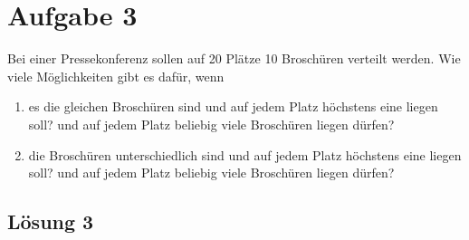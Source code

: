 \documentclass[main.tex]{subfiles}
\begin{document}
\section{Aufgabe 3}
Bei einer Pressekonferenz sollen auf 20 Plätze 10 Broschüren verteilt werden. Wie viele Möglichkeiten gibt es dafür, wenn

\begin{enumerate}
    \item es die gleichen Broschüren sind
    \subitem und auf jedem Platz höchstens eine liegen soll?
    \subitem  und auf jedem Platz beliebig viele Broschüren liegen dürfen?
    \item die Broschüren unterschiedlich sind
    \subitem  und auf jedem Platz höchstens eine liegen soll?
    \subitem  und auf jedem Platz beliebig viele Broschüren liegen dürfen?
\end{enumerate}

\subsection{Lösung 3}
\end{document}
